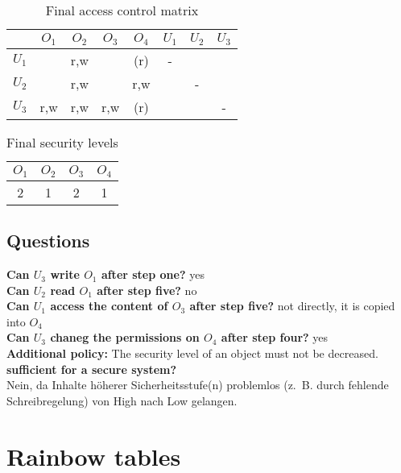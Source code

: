 \begin{table}[h]
\caption{Final access control matrix}
\begin{center}
\begin{tabular}{l|c|c|c|c|c|c|c|}
       & $O_1$ & $O_2$ & $O_3$ & $O_4$ & $U_1$ & $U_2$ & $U_3$ \\ \hline
 $U_1$ &       &  r,w  &       &  (r)  &   -   &       &       \\ \hline
 $U_2$ &       &  r,w  &       &  r,w  &       &   -   &       \\ \hline
 $U_3$ &  r,w  &  r,w  &  r,w  &  (r)  &       &       &   -   \\ \hline
\end{tabular}
\end{center}
\end{table}

\begin{table}[h!]
\caption{Final security levels}
\begin{center}
\begin{tabular}{|c|c|c|c|}
$O_1$ & $O_2$ & $O_3$ & $O_4$ \\ \hline
  2   &   1   &   2   &   1   \\ \hline
\end{tabular}
\end{center}
\end{table}

\newpage
\subsection*{Questions}
\textbf{Can $U_3$ write $O_1$ after step one?} yes \\
\textbf{Can $U_2$ read $O_1$ after step five?} no \\
\textbf{Can $U_1$ access the content of $O_3$ after step five?}
not directly, it is copied into $O_4$ \\
\textbf{Can $U_3$ chaneg the permissions on $O_4$ after step four?}
yes \\
\textbf{Additional policy:} The security level of an object must not be
decreased. \\
\textbf{sufficient for a secure system?} \\
Nein, da Inhalte höherer
Sicherheitsstufe(n) problemlos (z.~B. durch fehlende Schreibregelung) von High
nach Low gelangen.

\section{Rainbow tables}

